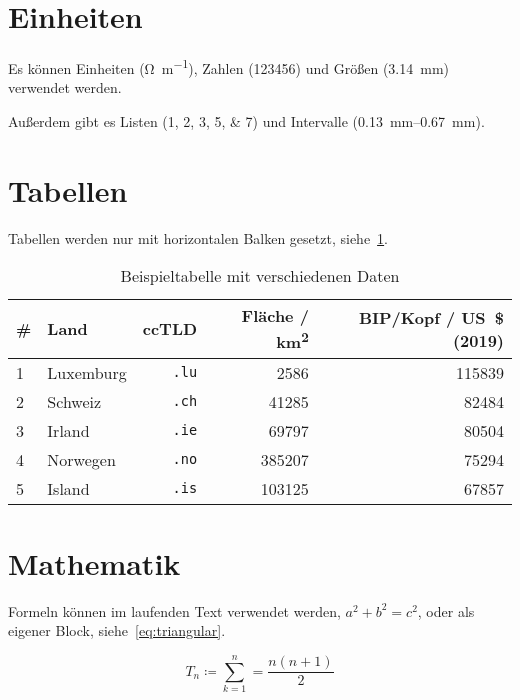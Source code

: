 \section{Einheiten}

Es können Einheiten (\unit{\ohm\per\meter}), Zahlen (\num{123456}) und
Größen (\qty{3.14}{\milli\meter}) verwendet werden.

Außerdem gibt es Listen (\numlist{1;2;3;5;7}) und
Intervalle (\qtyrange{0.13}{0.67}{\milli\metre}).

\section{Tabellen}

Tabellen werden nur mit horizontalen Balken gesetzt, siehe~\cref{tab:example}.

\begin{table}[htbp]
  \centering
  \begin{tabularx}{\textwidth}{lXrrr}\toprule
    \# & Land      & ccTLD        & Fläche / \unit{km^2} & BIP/Kopf / \unit{US\$} (2019) \\ \midrule
    1  & Luxemburg & \texttt{.lu} & \num{2586}           & \num{115839}                  \\
    2  & Schweiz   & \texttt{.ch} & \num{41285}          & \num{82484}                   \\
    3  & Irland    & \texttt{.ie} & \num{69797}          & \num{80504}                   \\
    4  & Norwegen  & \texttt{.no} & \num{385207}         & \num{75294}                   \\
    5  & Island    & \texttt{.is} & \num{103125}         & \num{67857}                   \\ \bottomrule
  \end{tabularx}
  \caption{Beispieltabelle mit verschiedenen Daten\label{tab:example}}
\end{table}

\section{Mathematik}

Formeln können im laufenden Text verwendet werden, \(a^2 + b^2 = c^2\),
oder als eigener Block, siehe~\cref{eq:triangular}.

\begin{equation}
  \label{eq:triangular}
  T_n \coloneq \sum^{n}_{k=1} = \frac{n(n+1)}{2}
\end{equation}
